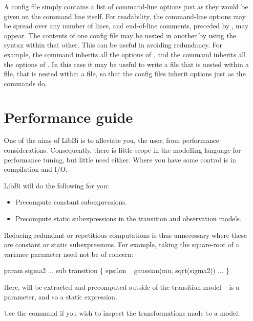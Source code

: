 A config file simply contains a list of command-line options just as they
would be given on the command line itself. For readability, the command-line
options may be spread over any number of lines, and end-of-line comments,
preceded by \bitt{\#}, may appear. The contents of one config file may be
nested in another by using the  syntax within that
other. This can be useful in avoiding redundancy. For example, the
 command inherits all the options of ,
and the  command inherits all the options of
. In this case it may be useful to write a
 file that is nested within a  file,
that is nested within a  file, so that the config files
inherit options just as the commands do.

\section{Performance guide\label{Performance guide}}

One of the aims of LibBi is to alleviate you, the user, from performance
considerations. Consequently, there is little scope in the modelling language
for performance tuning, but little need either. Where you have some control is
in compilation and I/O.

LibBi will do the following for you:
\begin{itemize}
\item Precompute constant subexpressions.
\item Precompute static subexpressions in the transition and observation
  models.
\end{itemize}

Reducing redundant or repetitious computations is thus unnecessary where these
are constant or static subexpressions. For example, taking the square-root of
a variance parameter need not be of concern:
\begin{bicode}
param sigma2
\(\ldots\)
sub transition \{
    epsilon ~ gaussian(mu, sqrt(sigma2))
    \(\ldots\)
\}
\end{bicode}
Here,  will be extracted and precomputed outside of the
transition model --  is a parameter, and so
 a static expression.

Use the  command if you wish to inspect the transformations
made to a model.

